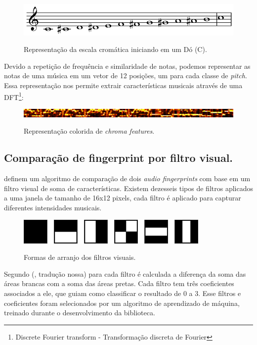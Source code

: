 \begin{figure}[h]
\caption{\small Representação da escala cromática iniciando em um Dó (C).}
\centering
\includegraphics[scale=0.6]{figs/escalacromatica.png}
\label{f.chromaticn}
\end{figure}

Devido a repetição de frequência e similaridade de notas, podemos representar as notas de uma música em um vetor de 12 posições, um para cada classe de \emph{pitch}. Essa representação nos permite extrair características musicais através de uma DFT\footnote{Discrete Fourier transform - Transformação discreta de Fourier}:

\begin{figure}[h]
\caption{\small Representação colorida de \emph{chroma features}.}
\centering
\includegraphics[scale=0.6]{figs/chr.png}
\label{f.chromaticn}
\end{figure}

\subsection{Comparação de fingerprint por filtro visual.}
\label{ss.visual}

\cite{pasteldeflango} definem um algoritmo de comparação de dois \emph{audio fingerprints} com base em um filtro visual de soma de características. Existem dezesseis tipos de filtros aplicados a uma janela de tamanho de 16x12 pixels, cada filtro é aplicado para capturar diferentes intensidades musicais.

\begin{figure}[h]
\caption{\small Formas de arranjo dos filtros visuais.}
\centering
\includegraphics[scale=1]{figs/filters.png}
\label{f.chromaticn}
\end{figure}

Segundo  (\citeyear{chromaworks}, tradução nossa) para cada filtro é calculada a diferença da soma das áreas brancas com a soma das áreas pretas. Cada filtro tem três coeficientes associados a ele, que guiam como classificar o resultado de 0 a 3. Esse filtros e coeficientes foram selecionados por um algoritmo de aprendizado de máquina, treinado durante o desenvolvimento da biblioteca. 

